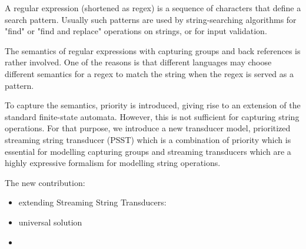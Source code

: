 A regular expression (shortened as regex) is a sequence of characters that define a search pattern. Usually such patterns are used by string-searching algorithms for "find" or "find and replace" operations on strings, or for input validation.  







The semantics of regular expressions with capturing groups and back references is rather involved. One of the reasons is that different languages may choose different semantics for a regex to match the string when the regex is served as a pattern. 

To capture the semantics, priority is introduced, giving rise to an extension of the standard finite-state automata. However, this is not sufficient for capturing string operations. For that purpose, we introduce  a new transducer model, prioritized streaming string transducer (PSST) which is a combination of priority which is essential for modelling capturing groups and streaming transducers which are a highly expressive formalism for modelling string operations. 


The new contribution: 

\begin{itemize}
	\item extending Streaming String Transducers: \cite{FR17}
	
	\item  universal solution 
	
	\item 
\end{itemize} 
